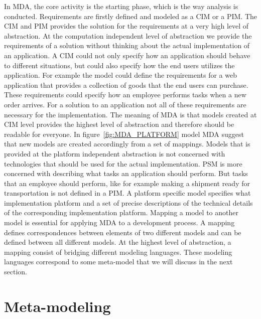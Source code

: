 In MDA, the core activity is the starting phase, which is the way analysis is
conducted. Requirements are firstly defined and modeled as a CIM or a PIM. The
CIM and PIM provides the solution for the requirements at a very high level of
abstraction. At the computation independent level of abstraction we provide the
requirements of a solution without thinking about the actual implementation of
an application. A CIM could not only specify how an application should behave to
different situations, but could also specify how the end users utilizes the
application. For example the model could define the requirements for a web
application that provides a collection of goods that the end users can purchase.
These requirements could specify how an employee performs tasks when a new order
arrives. For a solution to an application not all of these requirements are
necessary for the implementation. The meaning of MDA is that models created at
CIM level provides the highest level of abstraction and therefore should be
readable for everyone. In figure~\ref{fig:MDA_PLATFORM} model MDA suggest
that new models are created accordingly from a set of mappings. Models that is
provided at the platform independent abstraction is not concerned with
technologies that should be used for the actual implementation. PSM is more
concerned with describing what tasks an application should perform. But tasks
that an employee should perform, like for example making a shipment ready for
transportation is not defined in a PIM. A platform specific model specifies what
implementation platform and a set of precise descriptions of the technical
details of the corresponding implementation platform. Mapping a model to another
model is essential for applying MDA to a development process. A mapping defines
correspondences between elements of two different models and can be defined
between all different models. At the highest level of abstraction, a mapping
consist of bridging different modeling languages. These modeling languages
correspond to some meta-model that we will discuss in the next section.

\section{Meta-modeling}

